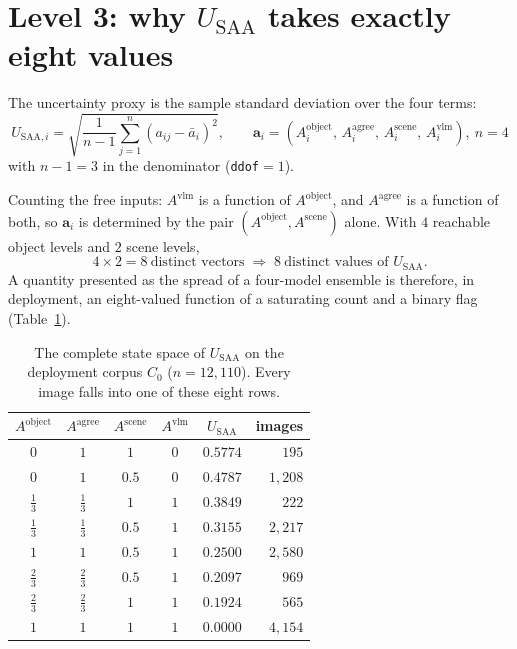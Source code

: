 \documentclass[12pt,a4paper]{report}
\begin{document}
\section{Level 3: why \texorpdfstring{$U_{\text{SAA}}$}{U(SAA)} takes exactly eight values}

The uncertainty proxy is the sample standard deviation over the four terms:
\begin{equation}
U_{\text{SAA},i} = \sqrt{\frac{1}{n-1}\sum_{j=1}^{n}\left(a_{ij}-\bar{a}_i\right)^2},
\qquad
\mathbf{a}_i = \left(A_i^{\text{object}},\, A_i^{\text{agree}},\, A_i^{\text{scene}},\, A_i^{\text{vlm}}\right),
\ n=4
\label{eq:d-usaa}
\end{equation}
with $n-1=3$ in the denominator (\texttt{ddof}$=1$).

Counting the free inputs: $A^{\text{vlm}}$ is a function of $A^{\text{object}}$, and $A^{\text{agree}}$ is a function of both, so $\mathbf{a}_i$ is determined by the pair $(A^{\text{object}}, A^{\text{scene}})$ alone. With $4$ reachable object levels and $2$ scene levels,
\[
4 \times 2 = 8 \ \text{distinct vectors} \;\Longrightarrow\; 8 \ \text{distinct values of } U_{\text{SAA}}.
\]
A quantity presented as the spread of a four-model ensemble is therefore, in deployment, an eight-valued function of a saturating count and a binary flag (Table~\ref{tab:state_space}).

\begin{table}[!htbp]
\centering
\caption[The complete state space of $U_{SAA}$ on the deployment corpus $C_0$]{The complete state space of $U_{\text{SAA}}$ on the deployment corpus $C_0$ ($n=12{,}110$). Every image falls into one of these eight rows.}
\label{tab:state_space}
\small
\begin{tabular}{cccc c r}
\toprule
$A^{\text{object}}$ & $A^{\text{agree}}$ & $A^{\text{scene}}$ & $A^{\text{vlm}}$ & $U_{\text{SAA}}$ & images \\
\midrule
$0$        & $1$        & $1$   & $0$ & $0.5774$ & $195$ \\
$0$        & $1$        & $0.5$ & $0$ & $0.4787$ & $1{,}208$ \\
$\tfrac13$ & $\tfrac13$ & $1$   & $1$ & $0.3849$ & $222$ \\
$\tfrac13$ & $\tfrac13$ & $0.5$ & $1$ & $0.3155$ & $2{,}217$ \\
$1$        & $1$        & $0.5$ & $1$ & $0.2500$ & $2{,}580$ \\
$\tfrac23$ & $\tfrac23$ & $0.5$ & $1$ & $0.2097$ & $969$ \\
$\tfrac23$ & $\tfrac23$ & $1$   & $1$ & $0.1924$ & $565$ \\
$1$        & $1$        & $1$   & $1$ & $0.0000$ & $4{,}154$ \\
\bottomrule
\end{tabular}
\end{table}
\end{document}
